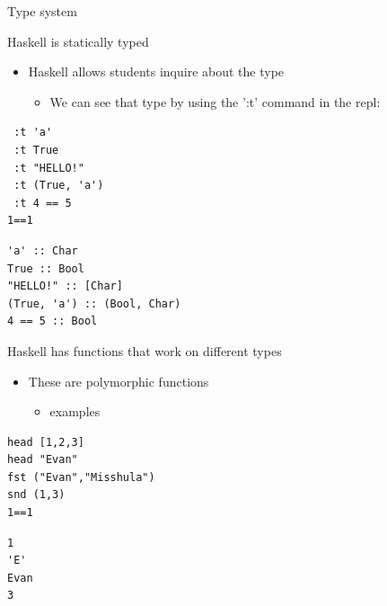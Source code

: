 \documentclass[presetation]{beamer}
\begin{document}
\begin{frame}[fragile,label={sec:org9c43f74}]{Type system}
 \begin{block}{Haskell is statically typed}
\begin{itemize}
\item Haskell allows students inquire about the type
\begin{itemize}
\item We can see that type by using the ':t' command in the repl:
\end{itemize}
\end{itemize}
\begin{verbatim}
 :t 'a'
 :t True
 :t "HELLO!"
 :t (True, 'a')
 :t 4 == 5
1==1
\end{verbatim}

\begin{verbatim}
'a' :: Char
True :: Bool
"HELLO!" :: [Char]
(True, 'a') :: (Bool, Char)
4 == 5 :: Bool
\end{verbatim}
\end{block}

\begin{block}{Haskell has functions that work on different types}
\pause
\begin{itemize}
\item These are polymorphic functions
\begin{itemize}
\item examples
\end{itemize}
\end{itemize}
\begin{verbatim}
head [1,2,3]
head "Evan"
fst ("Evan","Misshula")
snd (1,3)
1==1
\end{verbatim}

\begin{verbatim}
1
'E'
Evan
3
\end{verbatim}
\end{block}
\end{frame}
\end{document}
